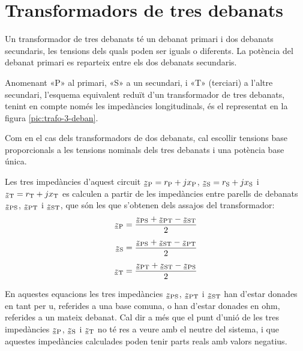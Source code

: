 \begin{exemple}
\end{exemple}

\section{Transformadors de tres debanats}\label{sec:trafo-3-deban}

Un transformador de tres debanats té un debanat primari i dos debanats secundaris, les tensions dels quals poden ser iguals o diferents. La potència del debanat primari es reparteix entre els dos debanats secundaris.

Anomenant «P» al primari, «S» a un secundari, i «T» (terciari) a l'altre secundari, l'esquema equivalent reduït d'un transformador de tres debanats, tenint en compte només les impedàncies longitudinals,  és el representat en la figura \vref{pic:trafo-3-deban}.

\begin{center}
    
    \label{pic:trafo-3-deban}
\end{center}

Com en el cas dels transformadors de dos debanats, cal escollir tensions base proporcionals a les tensions nominals dels tres debanats i una potència base única.

Les tres impedàncies d'aquest circuit $\cmplx{z}\ped{P} = r\ped{P} + j x\ped{P}$, $\cmplx{z}\ped{S} = r\ped{S} + j x\ped{S}$ i $\cmplx{z}\ped{T} = r\ped{T} + j x\ped{T}$ es calculen a partir de les impedàncies entre parells de debanats $\cmplx{z}\ped{PS}$, $\cmplx{z}\ped{PT}$ i $\cmplx{z}\ped{ST}$, que són les que s'obtenen dels assajos del transformador:
\begin{subequations}
\begin{align}
    \cmplx{z}\ped{P} &= \frac{\cmplx{z}\ped{PS}+\cmplx{z}\ped{PT}-\cmplx{z}\ped{ST}}{2}  \\[1ex]
    \cmplx{z}\ped{S} &= \frac{\cmplx{z}\ped{PS}+\cmplx{z}\ped{ST}-\cmplx{z}\ped{PT}}{2}  \\[1ex]
    \cmplx{z}\ped{T} &= \frac{\cmplx{z}\ped{PT}+\cmplx{z}\ped{ST}-\cmplx{z}\ped{PS}}{2}
\end{align}
\end{subequations}

En aquestes equacions  les tres impedàncies $\cmplx{z}\ped{PS}$, $\cmplx{z}\ped{PT}$ i $\cmplx{z}\ped{ST}$ han d'estar donades en tant per u, referides a una base comuna, o han d'estar donades en ohm, referides a un mateix debanat. Cal dir a més que el punt d'unió de les tres impedàncies $\cmplx{z}\ped{P}$, $\cmplx{z}\ped{S}$ i $\cmplx{z}\ped{T}$ no té res a veure amb el neutre del sistema, i que aquestes impedàncies calculades poden tenir parts reals amb valors  negatius.


